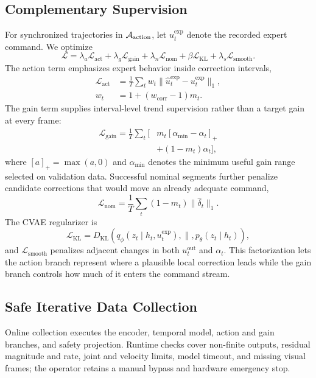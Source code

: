\subsection{Complementary Supervision}
For synchronized trajectories in $\mathcal{A}_{\mathrm{action}}$, let
$u^{\mathrm{exp}}_t$ denote the recorded expert command. We optimize
\begin{equation}
  \mathcal{L}=\lambda_a\mathcal{L}_{\mathrm{act}}+
  \lambda_g\mathcal{L}_{\mathrm{gain}}+
  \lambda_n\mathcal{L}_{\mathrm{nom}}+
  \beta\mathcal{L}_{\mathrm{KL}}+
  \lambda_s\mathcal{L}_{\mathrm{smooth}}.
  \label{eq:objective}
\end{equation}
The action term emphasizes expert behavior inside correction intervals,
\begin{align}
  \mathcal{L}_{\mathrm{act}}
  &=\frac{1}{T}\sum_t w_t
  \|\hat u^{\mathrm{exp}}_t-u^{\mathrm{exp}}_t\|_1,\\
  w_t&=1+(w_{\mathrm{corr}}-1)m_t.
  \label{eq:action_loss}
\end{align}
The gain term supplies interval-level trend supervision rather than a target
gain at every frame:
\begin{equation}
\begin{split}
  \mathcal{L}_{\mathrm{gain}}=\frac{1}{T}\sum_t
  \big[&m_t[\alpha_{\min}-\alpha_t]_+\\
       &+(1-m_t)\alpha_t\big],
  \label{eq:gain_loss}
\end{split}
\end{equation}
where $[a]_+=\max(a,0)$ and $\alpha_{\min}$ denotes the minimum useful gain
range selected on validation data. Successful nominal segments further
penalize candidate corrections that would move an already adequate command,
\begin{equation}
  \mathcal{L}_{\mathrm{nom}}=\frac{1}{T}\sum_t(1-m_t)
  \|\hat\delta_t\|_1.
  \label{eq:nominal_loss}
\end{equation}
The CVAE regularizer is
\begin{equation}
  \mathcal{L}_{\mathrm{KL}}=
  D_{\mathrm{KL}}\!\left(q_\phi(z_t\mid h_t,u^{\mathrm{exp}}_t),
  \|,p_\theta(z_t\mid h_t)\right),
\end{equation}
and $\mathcal{L}_{\mathrm{smooth}}$ penalizes adjacent changes in both
$u^{\mathrm{out}}_t$ and $\alpha_t$. This factorization lets the action branch
represent where a plausible local correction leads while the gain branch
controls how much of it enters the command stream.

\subsection{Safe Iterative Data Collection}
Online collection executes the encoder, temporal model, action and gain
branches, and safety projection. Runtime checks cover non-finite outputs,
residual magnitude and rate, joint and velocity limits, model timeout, and
missing visual frames; the operator retains a manual bypass and hardware
emergency stop.

